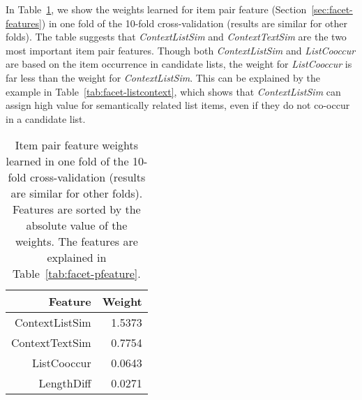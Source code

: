 In Table~\ref{tab:intrinsic-panalysis}, we show the weights learned for item pair feature (Section~\ref{sec:facet-features}) in one fold of the 10-fold cross-validation (results are similar for other folds). The table suggests that \textit{ContextListSim} and \textit{ContextTextSim} are the two most important item pair features. Though both \textit{ContextListSim} and \textit{ListCooccur} are based on the item occurrence in candidate lists, the weight for \textit{ListCooccur} is far less than the weight for \textit{ContextListSim}. This can be explained by the example in Table~\ref{tab:facet-listcontext}, which shows that \textit{ContextListSim} can assign high value for semantically related list items, even if they do not co-occur in a candidate list.

\begin{table}[H]
\centering
\caption{Item pair feature weights learned in one fold of the 10-fold cross-validation (results are similar for other folds). Features are sorted by the absolute value of the weights. The features are explained in Table~\ref{tab:facet-pfeature}.}
\label{tab:intrinsic-panalysis}
\begin{tabular}{|r|r|} \hline
Feature & Weight \\ \hline
ContextListSim & 1.5373 \\ \hline
ContextTextSim & 0.7754 \\ \hline
ListCooccur & 0.0643 \\ \hline
LengthDiff & 0.0271 \\ \hline
\end{tabular}
\end{table}

